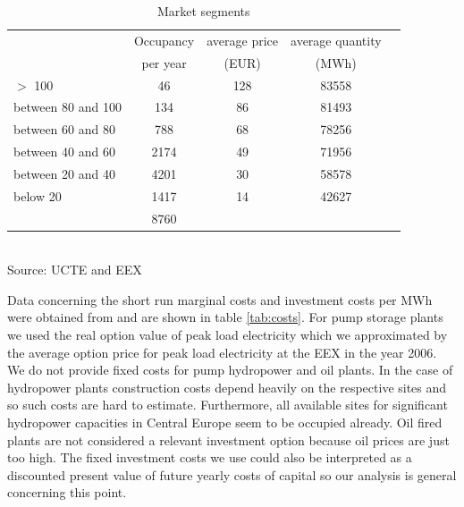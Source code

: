 \begin{table}[htb]
\centering
\caption{Market segments}
\vspace{0.3cm}
\begin{tabular}{lllll}
\hline
 & \multicolumn{1}{c}{Occupancy} & \multicolumn{1}{c}{average price} & \multicolumn{1}{c}{average quantity} &  \\ 
 & \multicolumn{1}{c}{per year} & \multicolumn{1}{c}{(EUR)} & \multicolumn{1}{c}{(MWh)} &  \\ 
 \hline
$>$ 100 & \multicolumn{1}{c}{46} & \multicolumn{1}{c}{128} & \multicolumn{1}{c}{83558} &  \\ 
between 80 and 100 & \multicolumn{1}{c}{134} & \multicolumn{1}{c}{86} & \multicolumn{1}{c}{81493} &  \\ 
between 60 and 80 & \multicolumn{1}{c}{788} & \multicolumn{1}{c}{68} & \multicolumn{1}{c}{78256} &  \\ 
between 40 and 60 & \multicolumn{1}{c}{2174} & \multicolumn{1}{c}{49} & \multicolumn{1}{c}{71956} &  \\ 
between 20 and 40 & \multicolumn{1}{c}{4201} & \multicolumn{1}{c}{30} & \multicolumn{1}{c}{58578} &  \\ 
below 20 & \multicolumn{1}{c}{1417} & \multicolumn{1}{c}{14} & \multicolumn{1}{c}{42627} &  \\
\hline
 & \multicolumn{1}{c}{8760} &  &  &  \\ 
 \hline
\end{tabular}
\label{tab:demand}
\\
\vspace{0.3cm}
\scriptsize Source: UCTE and EEX 
\end{table}


Data concerning the short run marginal costs and investment costs per MWh were obtained from \cite[p.46]{Auer2006} and are shown in table \ref{tab:costs}. For pump storage plants we used the real option value of peak load electricity which we approximated by the average option price for peak load electricity at the EEX in the year 2006. We do not provide fixed costs for pump hydropower and oil plants. In the case of hydropower plants construction costs depend heavily on the respective sites and so such costs are hard to estimate. Furthermore, all available sites for significant hydropower capacities in Central Europe seem to be occupied already. Oil fired plants are not considered a relevant investment option because oil prices are just too high. The fixed investment costs we use could also be interpreted as a discounted present value of future yearly costs of capital so our analysis is general concerning this point.

